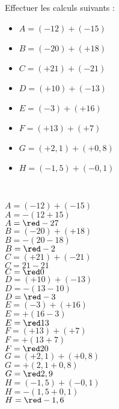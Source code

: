 \begin{exercice*}
   Effectuer les calculs suivants :   
      \begin{itemize}
         \item[] $A =(-12)+(-15)$
         \item[] $B =(-20)+(+18)$
         \item[] $C =(+21)+(-21)$
         \item[] $D =(+10)+(-13)$
         \item[] $E =(-3)+(+16)$
         \item[] $F =(+13)+(+7)$
         \item[] $G =(+2,1)+(+0,8)$
         \item[] $H =(-1,5)+(-0,1)$
      \end{itemize}   
\end{exercice*}

\begin{corrige}
   \ \\
   \begin{multicols}{2}   
      \begin{itemize}
         \def\item{}
         \item $A =(-12)+(-15)$  \\$A =-(12+15)$   \\$A ={\red -27}$ \\ \smallskip
         \item $B =(-20)+(+18)$  \\$B =-(20-18)$   \\$B ={\red -2}$  \\\smallskip
         \item $C =(+21)+(-21)$  \\$C =21-21$      \\$C ={\red 0}$   \\\smallskip
         \item $D =(+10)+(-13)$  \\$D =-(13-10)$   \\$D ={\red -3}$  \\\smallskip
         \item $E =(-3)+(+16)$   \\$E =+(16-3)$    \\$E ={\red 13}$  \\\smallskip
         \item $F =(+13)+(+7)$   \\$F =+(13+7)$    \\$F ={\red 20}$  \\\smallskip
         \item $G =(+2,1)+(+0,8)$\\$G =+(2,1+0,8)$ \\$G ={\red 2,9}$ \\\smallskip
         \item $H =(-1,5)+(-0,1)$\\$H =-(1,5+0,1)$ \\$H ={\red -1,6}$
      \end{itemize}
   \end{multicols}
\end{corrige}

